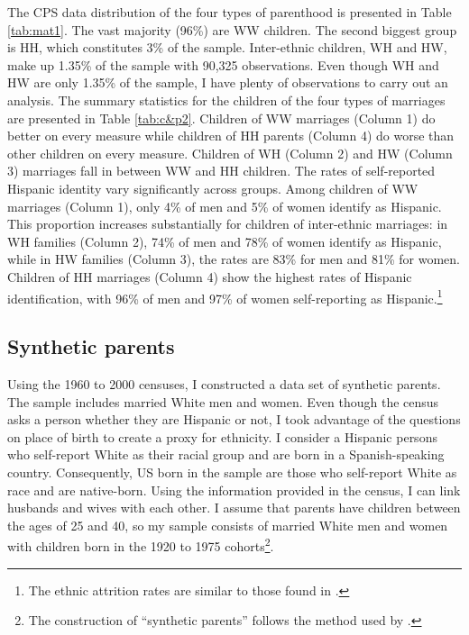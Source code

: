 The CPS data distribution of the four types of parenthood is presented in Table \ref{tab:mat1}. The vast majority (96\%) are WW children. The second biggest group is HH, which constitutes 3\% of the sample. Inter-ethnic children, WH and HW, make up 1.35\% of the sample with 90,325 observations. Even though WH and HW are only 1.35\% of the sample, I have plenty of observations to carry out an analysis. The summary statistics for the children of the four types of marriages are presented in Table \ref{tab:c&p2}. Children of WW marriages (Column 1) do better on every measure while children of HH parents (Column 4) do worse than other children on every measure. Children of WH (Column 2) and HW (Column 3) marriages fall in between WW and HH children. The rates of self-reported Hispanic identity vary significantly across groups. Among children of WW marriages (Column 1), only 4\% of men and 5\% of women identify as Hispanic. This proportion increases substantially for children of inter-ethnic marriages: in WH families (Column 2), 74\% of men and 78\% of women identify as Hispanic, while in HW families (Column 3), the rates are 83\% for men and 81\% for women. Children of HH marriages (Column 4) show the highest rates of Hispanic identification, with 96\% of men and 97\% of women self-reporting as Hispanic.\footnote{The ethnic attrition rates are similar to those found in \textcite{antmanEthnicAttritionObserved2016,antmanEthnicAttritionAssimilation2020, hadah2024effect}.}
 
\subsection{Synthetic parents}

Using the 1960 to 2000 censuses, I constructed a data set of synthetic parents. The sample includes married White men and women. Even though the census asks a person whether they are Hispanic or not, I took advantage of the questions on place of birth to create a proxy for ethnicity. I consider a Hispanic persons who self-report White as their racial group and are born in a Spanish-speaking country. Consequently, US born in the sample are those who self-report White as race and are native-born. Using the information provided in the census, I can link husbands and wives with each other. I assume that parents have children between the ages of 25 and 40, so my sample consists of married White men and women with children born in the 1920 to 1975 cohorts\footnote{The construction of ``synthetic parents'' follows the method used by \textcite{rubinstein2014pride}.}.

